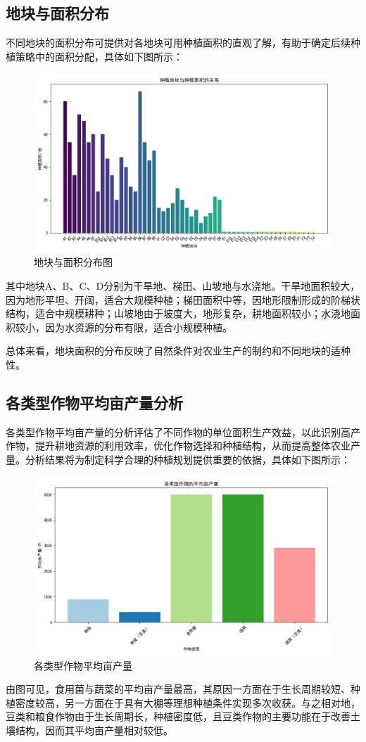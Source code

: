 \documentclass[withoutpreface]{cumcmthesis}
\begin{document}
\subsection{地块与面积分布}
不同地块的面积分布可提供对各地块可用种植面积的直观了解，有助于确定后续种植策略中的面积分配，具体如下图所示：
\begin{figure}[H]
    \centering
    \includegraphics[width=.9\textwidth]{Figure_1.png}
    \caption{地块与面积分布图}
    \label{fig:region_area}
\end{figure}
其中地块A、B、C、D分别为干旱地、梯田、山坡地与水浇地。干旱地面积较大，因为地形平坦、开阔，适合大规模种植；梯田面积中等，因地形限制形成的阶梯状结构，适合中规模耕种；山坡地由于坡度大，地形复杂，耕地面积较小；水浇地面积较小，因为水资源的分布有限，适合小规模种植。

总体来看，地块面积的分布反映了自然条件对农业生产的制约和不同地块的适种性。

\subsection{各类型作物平均亩产量分析}
各类型作物平均亩产量的分析评估了不同作物的单位面积生产效益，以此识别高产作物，提升耕地资源的利用效率，优化作物选择和种植结构，从而提高整体农业产量。分析结果将为制定科学合理的种植规划提供重要的依据，具体如下图所示：
\begin{figure}[H]
    \centering
    \includegraphics[width=.9\textwidth]{Figure_2.png}
    \caption{各类型作物平均亩产量}
    \label{fig:crop_yield}
\end{figure}
由图可见，食用菌与蔬菜的平均亩产量最高，其原因一方面在于生长周期较短、种植密度较高，另一方面在于具有大棚等理想种植条件实现多次收获。与之相对地，豆类和粮食作物由于生长周期长，种植密度低，且豆类作物的主要功能在于改善土壤结构，因而其平均亩产量相对较低。
\newpage
\end{document}
